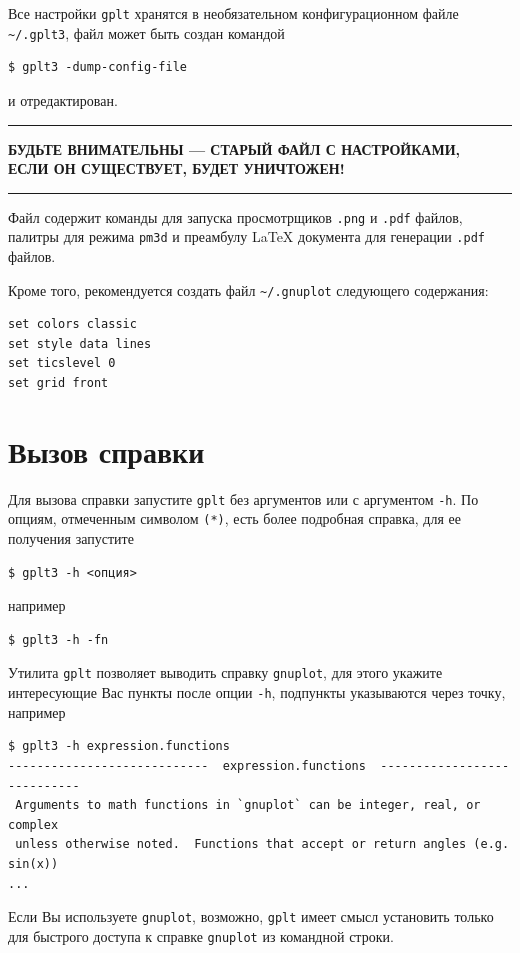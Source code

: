 \documentclass[12pt]{article}
\def\gplt{{\tt gplt}}
\def\gnuplot{{\tt gnuplot}}
\def\png{{\tt .png}}
\def\pdf{{\tt .pdf}}
\begin{document}
Все настройки \gplt{} хранятся в необязательном конфигурационном файле  \verb'~/.gplt3',
файл может быть создан командой
\begin{verbatim}
$ gplt3 -dump-config-file
\end{verbatim}
и отредактирован.
\newpage

\hrule
\begin{center}
\bf БУДЬТЕ ВНИМАТЕЛЬНЫ --- СТАРЫЙ ФАЙЛ С НАСТРОЙКАМИ,\\
ЕСЛИ ОН СУЩЕСТВУЕТ, БУДЕТ УНИЧТОЖЕН!
  \end{center}
\hrule
\phantom{.}

Файл содержит команды для запуска просмотрщиков \png{} и \pdf{} файлов, палитры для режима \verb'pm3d' и преамбулу \LaTeX{} документа для генерации \pdf{} файлов.

Кроме того, рекомендуется создать файл \verb'~/.gnuplot' следующего содержания:
\begin{verbatim}
set colors classic
set style data lines
set ticslevel 0
set grid front
\end{verbatim}

\section{Вызов справки}
Для вызова справки запустите \gplt{} без аргументов или с аргументом \verb'-h'. По опциям, отмеченным символом \verb'(*)',
есть более подробная справка, для ее получения запустите
\begin{figure}
\end{figure}
\begin{verbatim}
$ gplt3 -h <опция>
\end{verbatim}
например
\begin{verbatim}
$ gplt3 -h -fn
\end{verbatim}

Утилита \gplt{} позволяет выводить справку \gnuplot, для этого укажите интересующие Вас пункты после опции \verb'-h',
подпункты указываются через точку, например
\begin{verbatim}
$ gplt3 -h expression.functions
----------------------------  expression.functions  ----------------------------
 Arguments to math functions in `gnuplot` can be integer, real, or complex
 unless otherwise noted.  Functions that accept or return angles (e.g. sin(x))
...
\end{verbatim}
Если Вы используете \gnuplot, возможно, \gplt{} имеет смысл установить только для быстрого доступа к справке \gnuplot{} из командной строки.
\end{document}
